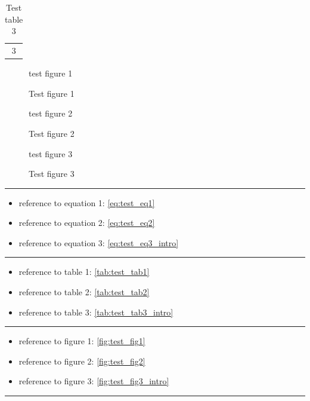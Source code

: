 \begin{table}
	\centering
	\begin{tabular}{c}
		3
	\end{tabular}
	\caption{Test table 3}
	\label{tab:test_tab3_intro}
\end{table}

%
\begin{figure}[h!]
	\centering
	test figure 1
	\caption{Test figure 1}
	\label{fig:test_fig1}
\end{figure}

\begin{figure}[h!]
	\centering
	test figure 2
	\caption{Test figure 2}
	\label{fig:test_fig2}
\end{figure}

\begin{figure}[h!]
	\centering
	test figure 3
	\caption{Test figure 3}
	\label{fig:test_fig3_intro}
\end{figure}

%
\hrule
\begin{itemize}
	\item reference to equation 1: \eqref{eq:test_eq1}
	\item reference to equation 2: \eqref{eq:test_eq2}
	\item reference to equation 3: \eqref{eq:test_eq3_intro}
\end{itemize}
\hrule
\begin{itemize}
	\item reference to table 1: \eqref{tab:test_tab1}
	\item reference to table 2: \eqref{tab:test_tab2}
	\item reference to table 3: \eqref{tab:test_tab3_intro}
\end{itemize}
\hrule
\begin{itemize}
	\item reference to figure 1: \eqref{fig:test_fig1}
	\item reference to figure 2: \eqref{fig:test_fig2}
	\item reference to figure 3: \eqref{fig:test_fig3_intro}
\end{itemize}
\hrule

%



%


%
